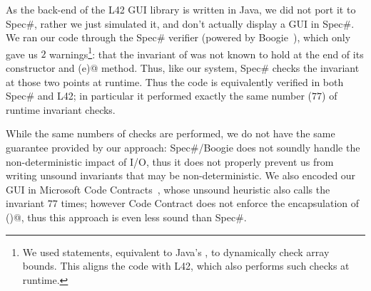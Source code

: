 As the back-end of the L42 GUI library is written in Java, we did not port it to Spec\#, rather we just simulated it, and don't actually display a GUI in Spec\#.
We ran our code through the Spec\# verifier (powered by Boogie~\cite{DBLP:conf/fmco/BarnettCDJL05}), which only gave us $2$ warnings\footnote{We used \Q@assume@ statements, equivalent to Java's \Q@assert@, to dynamically check array bounds. %
This aligns the code with L42, which also performs such checks at runtime.}: that the invariant of \Q@SafeMovable@ was not known to hold at the end of its constructor and \Q@dispatch(e)@ method. Thus, like our system, Spec\# checks the invariant
at those two points at runtime. Thus the code is equivalently verified in both Spec\# and L42; in particular it performed exactly the same number ($77$) of runtime invariant checks.

While the same numbers of checks are performed, we do not have the same guarantee provided by our approach:  Spec\#/Boogie does not soundly handle the non-deterministic impact of I/O, thus 
it does not properly prevent us from writing unsound
invariants that may be non-deterministic.
We also encoded our GUI in Microsoft Code Contracts~\cite{DBLP:conf/sac/FahndrichBL10}, whose unsound heuristic also calls the invariant $77$ times; however Code Contract does not enforce the
encapsulation of \Q@children()@, thus this approach is even less sound than Spec\#.



